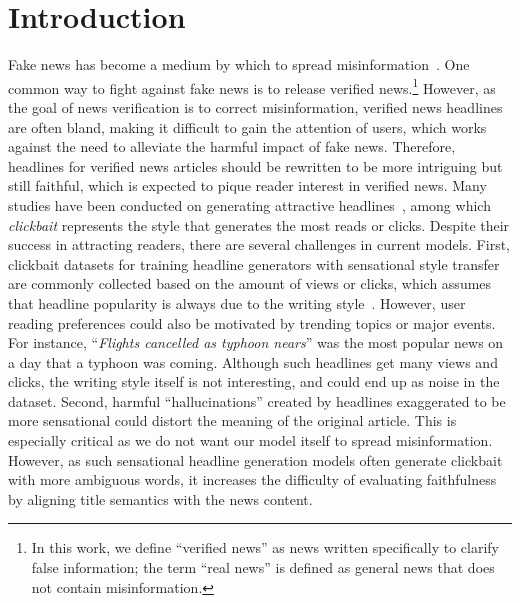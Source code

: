\label{sec-intro}
\section{Introduction}
Fake news has become a medium by which to spread
misinformation~\cite{oshikawa-etal-2020-survey, acmwebfakenews}.
One common way to fight against fake news is to release verified
news.\footnote{In this work, we define ``verified news'' as news written
specifically to clarify false information; the term ``real news''  is defined
as general news that does not contain misinformation.} However,
as the goal of news verification is to correct misinformation, verified news headlines
are often bland, making it difficult to gain the attention of users, which
works against the need to alleviate the harmful impact of fake news.
Therefore, headlines for verified news articles should be rewritten to be more
intriguing but still faithful, which is expected to pique reader interest in
verified news. Many studies have been
conducted on generating attractive
headlines~\cite{jin-etal-2020-hooks,xu-etal-2019-clickbait}, among which
\textit{clickbait} represents the style that generates the most reads or
clicks.
Despite their success in attracting readers, there are several challenges in
current models. 
First, clickbait datasets for training headline generators with sensational
style transfer are commonly collected based on the amount of views or clicks,
which assumes that headline popularity is always due to 
the writing style~\cite{popularitybased}. However, user reading preferences could also be motivated by
trending topics or major events. For instance, ``\textit{Flights cancelled as
typhoon nears}'' was the most popular news on a day that a typhoon was coming.
Although such headlines get many views and clicks, the writing style itself is
not interesting, and could end up as noise
in the dataset. 
Second, harmful ``hallucinations'' created by headlines exaggerated to be more
sensational could distort the meaning of the original article. This is
especially critical as we do not want our model itself to spread
misinformation. 
However, as such sensational headline generation models often generate
clickbait with more ambiguous words, it increases the difficulty of evaluating faithfulness by aligning
title semantics with the news content. 

